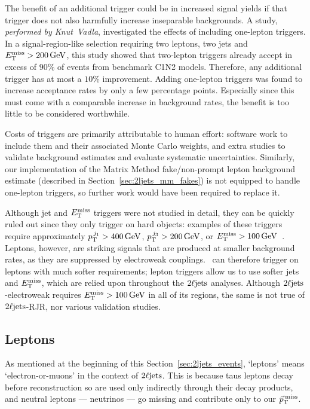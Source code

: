 The benefit of an additional trigger could be in increased signal yields if
that trigger does not also harmfully increase inseparable backgrounds.
A study, \emph{performed by Knut~Vadla}, investigated the effects
of including one-lepton triggers.
In a signal-region-like selection requiring two leptons, two jets and
$\met > 200\,\eV[G]$, this study showed that two-lepton triggers already accept
in excess of $90\%$ of events from benchmark C1N2 models.
Therefore, any additional trigger has at most a $10\%$ improvement.
Adding one-lepton triggers was found to increase acceptance rates by only a
few percentage points.
Especially since this must come with a comparable increase in background rates,
the benefit is too little to be considered worthwhile.

Costs of triggers are primarily attributable to human effort:
software work to include them and their associated Monte Carlo weights, and
extra studies to validate background estimates and evaluate systematic
uncertainties.
Similarly, our implementation of the Matrix Method fake/non-prompt lepton
background estimate (described in Section~\ref{sec:2ljets_mm_fakes}) is not
equipped to handle one-lepton triggers, so further work would have been
required to replace it.

Although jet and $\met$ triggers were not studied in detail, they can be
quickly ruled out since they only trigger on hard objects:
examples of these triggers require
approximately $\ptjone > 400\,\eV[G]$, $p_\mathrm{T}^{\,j_3} > 200\,\eV[G]$, or
$\met > 100\,\eV[G]$~\cite{atlas_twiki_lowest_unprescaled}.
Leptons, however, are striking signals that are produced at smaller
background rates, as they are suppressed by electroweak couplings.
\atlas\ can therefore trigger on leptons with much softer requirements;
lepton triggers allow us to use softer jets and $\met$, which are relied upon
throughout the $\twoljets$ analyses.
Although $\twoljets$-electroweak requires $\met > 100\,\eV[G]$ in all of its
regions, the same is not true of $\twoljets$-RJR, nor various validation
studies.


\subsection{Leptons}
\label{sec:2ljets_events_leptons}
As mentioned at the beginning of this Section~\ref{sec:2ljets_events},
`leptons' means `electron-or-muons' in the context of $\twoljets$.
This is because taus leptons decay before reconstruction so are used only
indirectly through their decay products, and neutral leptons
--- neutrinos --- go missing and contribute only to our $\ptmiss$.

